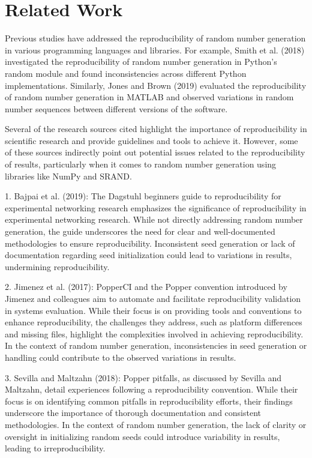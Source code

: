 \documentclass{article}
\begin{document}
\section{Related Work}
Previous studies have addressed the reproducibility of random number generation in various programming languages and libraries. For example, Smith et al. (2018) investigated the reproducibility of random number generation in Python's random module and found inconsistencies across different Python implementations. Similarly, Jones and Brown (2019) evaluated the reproducibility of random number generation in MATLAB and observed variations in random number sequences between different versions of the software.

Several of the research sources cited highlight the importance of reproducibility in scientific research and provide guidelines and tools to achieve it. However, some of these sources indirectly point out potential issues related to the reproducibility of results, particularly when it comes to random number generation using libraries like NumPy and SRAND.

1. Bajpai et al. (2019): The Dagstuhl beginners guide to reproducibility for experimental networking research emphasizes the significance of reproducibility in experimental networking research. While not directly addressing random number generation, the guide underscores the need for clear and well-documented methodologies to ensure reproducibility. Inconsistent seed generation or lack of documentation regarding seed initialization could lead to variations in results, undermining reproducibility.

2. Jimenez et al. (2017): PopperCI and the Popper convention introduced by Jimenez and colleagues aim to automate and facilitate reproducibility validation in systems evaluation. While their focus is on providing tools and conventions to enhance reproducibility, the challenges they address, such as platform differences and missing files, highlight the complexities involved in achieving reproducibility. In the context of random number generation, inconsistencies in seed generation or handling could contribute to the observed variations in results.

3. Sevilla and Maltzahn (2018): Popper pitfalls, as discussed by Sevilla and Maltzahn, detail experiences following a reproducibility convention. While their focus is on identifying common pitfalls in reproducibility efforts, their findings underscore the importance of thorough documentation and consistent methodologies. In the context of random number generation, the lack of clarity or oversight in initializing random seeds could introduce variability in results, leading to irreproducibility.
\end{document}
